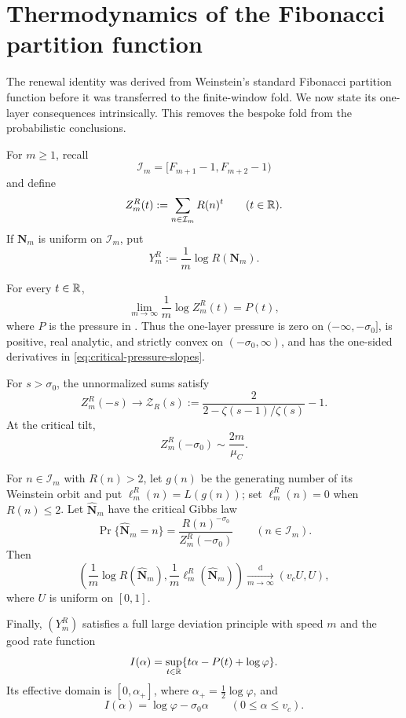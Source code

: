 \section{Thermodynamics of the Fibonacci partition function}
\label{sec:standard-thermodynamics}

The renewal identity was derived from Weinstein's standard Fibonacci
partition function before it was transferred to the finite-window fold.  We
now state its one-layer consequences intrinsically.  This removes the bespoke
fold from the probabilistic conclusions.

For \(m\ge1\), recall
\[
 \mathcal I_m=[F_{m+1}-1,F_{m+2}-1)
\]
and define
\[
 Z_m^R(t):=\sum_{n\in\mathcal I_m}R(n)^t
 \qquad(t\in\mathbb{R}).
\]
If \(\mathbf N_m\) is uniform on \(\mathcal I_m\), put
\[
 Y_m^R:=\frac1m\log R(\mathbf N_m).
\]

\begin{theorem}
\label{thm:standard-fibonacci-thermodynamics}
For every \(t\in\mathbb{R}\),
\begin{equation}
 \lim_{m\to\infty}\frac1m\log Z_m^R(t)=P(t),
 \label{eq:standard-layer-pressure}
\end{equation}
where \(P\) is the pressure in .  Thus the
one-layer pressure is zero on \((-\infty,-\sigma_0]\), is positive, real
analytic, and strictly convex on \((-\sigma_0,\infty)\), and has the
one-sided derivatives in \eqref{eq:critical-pressure-slopes}.

For \(s>\sigma_0\), the unnormalized sums satisfy
\begin{equation}
 Z_m^R(-s)\longrightarrow
 \mathcal Z_R(s):=
 \frac2{2-\zeta(s-1)/\zeta(s)}-1.
 \label{eq:standard-layer-frozen-limit}
\end{equation}
At the critical tilt,
\begin{equation}
 Z_m^R(-\sigma_0)\sim\frac{2m}{\mu_C}.
 \label{eq:standard-layer-critical-size}
\end{equation}

For \(n\in\mathcal I_m\) with \(R(n)>2\), let \(g(n)\) be the generating
number of its Weinstein orbit and put \(\ell_m^R(n)=L(g(n))\); set
\(\ell_m^R(n)=0\) when \(R(n)\le2\).  Let \(\widehat{\mathbf N}_m\) have the
critical Gibbs law
\[
 \Pr\{\widehat{\mathbf N}_m=n\}
 =\frac{R(n)^{-\sigma_0}}{Z_m^R(-\sigma_0)}
 \qquad(n\in\mathcal I_m).
\]
Then
\begin{equation}
 \left(
  \frac1m\log R(\widehat{\mathbf N}_m),
  \frac1m\ell_m^R(\widehat{\mathbf N}_m)
 \right)
 \xrightarrow[m\to\infty]{\mathrm d}(v_cU,U),
 \label{eq:standard-layer-critical-gibbs}
\end{equation}
where \(U\) is uniform on \([0,1]\).

Finally, \((Y_m^R)\) satisfies a full large deviation principle with speed
\(m\) and the good rate function
\begin{equation}
 I(\alpha)=\sup_{t\in\mathbb{R}}
 \{t\alpha-P(t)+\log\varphi\}.
 \label{eq:standard-layer-ldp-rate}
\end{equation}
Its effective domain is \([0,\alpha_+]\), where
\(\alpha_+=\tfrac12\log\varphi\), and
\[
 I(\alpha)=\log\varphi-\sigma_0\alpha
 \qquad(0\le\alpha\le v_c).
\]
\end{theorem}

